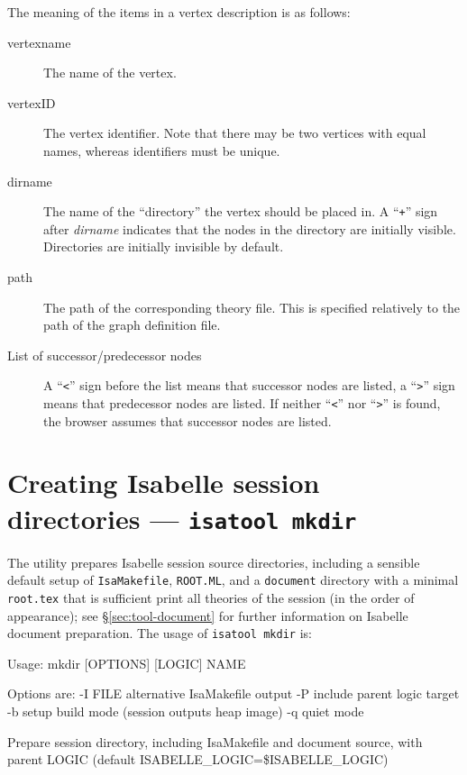 The meaning of the items in a vertex description is as follows:
\begin{description}
  
\item[vertexname] The name of the vertex.
  
\item[vertexID] The vertex identifier. Note that there may be two
  vertices with equal names, whereas identifiers must be unique.
  
\item[dirname] The name of the ``directory'' the vertex should be
  placed in.  A ``{\tt +}'' sign after {\it dirname} indicates that
  the nodes in the directory are initially visible. Directories are
  initially invisible by default.
  
\item[path] The path of the corresponding theory file. This is
  specified relatively to the path of the graph definition file.
  
\item[List of successor/predecessor nodes] A ``{\tt <}'' sign before
  the list means that successor nodes are listed, a ``{\tt >}'' sign
  means that predecessor nodes are listed. If neither ``{\tt <}'' nor
  ``{\tt >}'' is found, the browser assumes that successor nodes are
  listed.

\end{description}


\section{Creating Isabelle session directories --- \texttt{isatool mkdir}}
\label{sec:tool-mkdir}

The  utility prepares Isabelle session source directories,
including a sensible default setup of \texttt{IsaMakefile}, \texttt{ROOT.ML},
and a \texttt{document} directory with a minimal \texttt{root.tex} that is
sufficient print all theories of the session (in the order of appearance); see
\S\ref{sec:tool-document} for further information on Isabelle document
preparation.  The usage of \texttt{isatool mkdir} is:
\begin{ttbox}
Usage: mkdir [OPTIONS] [LOGIC] NAME

  Options are:
    -I FILE      alternative IsaMakefile output
    -P           include parent logic target
    -b           setup build mode (session outputs heap image)
    -q           quiet mode

  Prepare session directory, including IsaMakefile and document source,
  with parent LOGIC (default ISABELLE_LOGIC=\$ISABELLE_LOGIC)
\end{ttbox}

